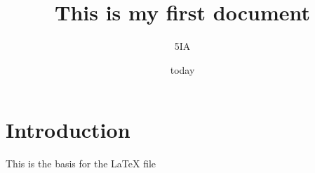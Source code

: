 \documentclass{article}
\title{This is my first document}
\author{5IA}
\date{today}
\begin{document}
\maketitle
\section{Introduction}



    This is the basis for the LaTeX file
\end{document}
